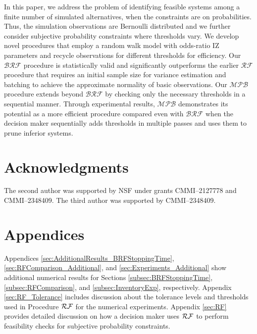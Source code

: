 \documentclass[11pt]{article}
\def\bibsep{\smallskipamount}%
\begin{document}
In this paper, we address the problem of identifying feasible systems among a finite number of simulated alternatives, when the constraints are on probabilities. Thus, the simulation observations are Bernoulli distributed and we further consider subjective probability constraints where thresholds vary. We develop novel procedures that employ a random walk model with odds-ratio IZ parameters and recycle observations for different thresholds for efficiency. Our $\mathcal{BRF}$ procedure is statistically valid and significantly outperforms the earlier $\mathcal{RF}$ procedure that requires an initial sample size for variance estimation and batching to achieve the approximate normality of basic observations. Our $\mathcal{MPB}$ procedure extends beyond $\mathcal{BRF}$ by checking only the necessary thresholds in a sequential manner. Through experimental results, $\mathcal{MPB}$ demonstrates its potential as a more efficient procedure compared even with $\mathcal{BRF}$ when the decision maker sequentially adds thresholds in multiple passes and uses them to prune inferior systems.


\section*{Acknowledgments}
The second author was supported by NSF under grants CMMI--2127778 and CMMI--2348409. The third author was supported by CMMI--2348409.



\singlespacing
{\footnotesize 
	
	
}

\clearpage
\appendix

\section*{Appendices}

Appendices \ref{sec:AdditionalResults_BRFStoppingTime}, \ref{sec:RFComparison_Additional}, and \ref{sec:Experiments_Additional} show additional numerical results for Sections \ref{subsec:BRFStoppingTime}, \ref{subsec:RFComparison}, and \ref{subsec:InventoryExp}, respectively. 
Appendix \ref{sec:RF_Tolerance} includes discussion about the tolerance levels and thresholds used in Procedure ${\cal RF}$ for the numerical experiments. Appendix \ref{sec:RF} provides detailed discussion on how a decision maker uses ${\cal RF}$ to perform feasibility checks for subjective probability constraints. 
\end{document}
